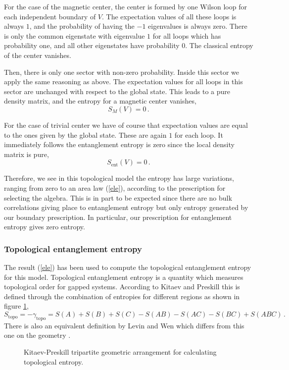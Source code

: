 \documentclass[12pt,a4paper]{article}
\newcommand{\be}{\begin{equation}}
\newcommand{\ee}{\end{equation}}
\def\be{\begin{equation}}
\def\ee{\end{equation}}
\begin{document}
For the case of the magnetic center, the center is formed by one Wilson loop for each independent boundary of $V$. The 
expectation values of all these loops is always $1$, and the probability of having the $-1$ eigenvalues is always zero. There 
is only the common eigenstate with eigenvalue $1$ for all loops which has probability one, and all other eigenstates have 
probability $0$. The classical entropy of the center vanishes. 

Then, there is only one sector with non-zero probability. 
Inside this sector we apply the same reasoning as above. The expectation values for all loops in this sector are unchanged with 
respect to the global state. This leads to a pure density matrix, and the entropy for a magnetic center vanishes,
\be
S_M(V)=0\,.
\ee 

For the case of trivial center we have of course that expectation values are equal to the ones given by the global state. These 
are again $1$ for each loop. It immediately follows the entanglement entropy is zero since the local density matrix is pure,
\be
S_{\textrm{ent}}(V)=0\,.
\ee 

Therefore, we see in this topological model the entropy has large variations, ranging from zero to an area law (\ref{ele}), according to the 
prescription for selecting the algebra. This is in part to be expected since there are no bulk correlations giving place to entanglement entropy but only 
entropy generated by our boundary prescription. In particular, our prescription for entanglement entropy gives zero entropy.

\subsubsection{Topological entanglement entropy}

The result (\ref{ele}) has been used to compute the topological entanglement entropy for this model. Topological entanglement 
entropy is a quantity which measures topological order for gapped systems. According to Kitaev and Preskill \cite{kitaev} this is 
defined through the combination of entropies for different regions as shown in figure \ref{topologica},
\be
S_{\textrm{topo}}=-\gamma_{\textrm{topo}}=S(A)+S(B)+S(C)-S(AB)-S(AC)-S(BC)+S(ABC)\,.\label{topo}
\ee
There is also an equivalent definition by Levin and Wen which differs from this one on the geometry \cite{Wen}.  

\begin{figure}
\centering
\leavevmode
\epsfysize=4cm
\bigskip
\caption{Kitaev-Preskill tripartite geometric arrangement for calculating topological entropy.}
\label{topologica}
\end{figure}
\end{document}
